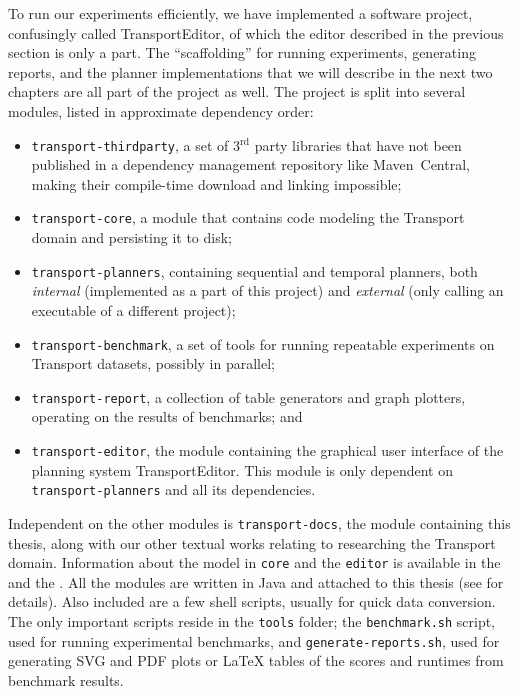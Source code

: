 To run our experiments efficiently, we have implemented a software project,
confusingly called TransportEditor, of which the editor described in
the previous section is only a part.
The ``scaffolding'' for running experiments, generating reports, and the planner implementations that we will describe in the next two chapters are all part
of the project as well.
The project is split into several modules, listed in approximate dependency order:
\begin{itemize}
\item \texttt{transport-thirdparty}, a set of 3$^\textrm{rd}$ party libraries
that have not been published in a dependency management repository like Maven~Central,
making their compile-time download and linking impossible;
\item \texttt{transport-core}, a module that contains code modeling the Transport
domain and persisting it to disk;
\item \texttt{transport-planners}, containing sequential and temporal planners, both \textit{internal} (implemented as a part of this project) and \textit{external}
(only calling an executable of a different project);
\item \texttt{transport-benchmark}, a set of tools for running repeatable
experiments on Transport datasets, possibly in parallel;
\item \texttt{transport-report}, a collection of table generators and graph plotters,
operating on the results of benchmarks; and
\item \texttt{transport-editor}, the module containing the graphical user interface
of the planning system TransportEditor. This module is only dependent
on \texttt{transport-planners} and all its dependencies.
\end{itemize}
Independent on the other modules is \texttt{transport-docs},
the module containing this thesis,
along with our other textual works relating to researching the Transport domain.
Information about the model in \texttt{core} and the
\texttt{editor}  
is available in the  and the .
All the modules are written in Java and attached to this thesis (see  for details). Also included are a few shell scripts, usually for quick
data conversion. The only important scripts reside in the \texttt{tools} folder;
the \texttt{benchmark.sh} script, used for running experimental benchmarks,
and \texttt{generate-reports.sh}, used for generating SVG and PDF plots or \LaTeX{} tables of the scores and runtimes from benchmark results.

